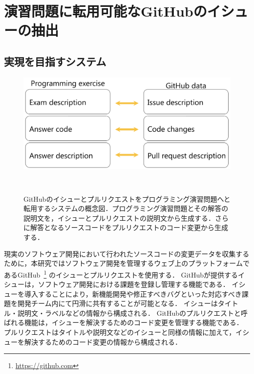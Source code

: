 \def\vector#1{\mbox{\boldmath $#1$}}

\chapter[演習問題に転用可能なGitHubのイシューの抽出]{演習問題に転用可能なGitHubのイシューの抽出}
\graphicspath{{Chapters_implementation/Figs/}}

\label{section:issue-classification}



\section{実現を目指すシステム}

\begin{figure}[tb]
    \centering
    \includegraphics[width=0.9\columnwidth]{system_diagram.png}
    \caption{GitHubのイシューとプルリクエストをプログラミング演習問題へと転用するシステムの概念図．プログラミング演習問題とその解答の説明文を，イシューとプルリクエストの説明文から生成する．さらに解答となるソースコードをプルリクエストのコード変更から生成する．}~\label{fig:system_diagram}
\end{figure}

現実のソフトウェア開発において行われたソースコードの変更データを収集するために，本研究ではソフトウェア開発を管理するウェブ上のプラットフォームであるGitHub~\footnote{\url{https://github.com}} のイシューとプルリクエストを使用する．
GitHubが提供するイシューは，ソフトウェア開発における課題を登録し管理する機能である．
イシューを導入することにより，新機能開発や修正すべきバグといった対応すべき課題を開発チーム内にて円滑に共有することが可能となる．
イシューはタイトル・説明文・ラベルなどの情報から構成される．
GitHubのプルリクエストと呼ばれる機能は，イシューを解決するためのコード変更を管理する機能である．
プルリクエストはタイトルや説明文などのイシューと同様の情報に加えて，イシューを解決するためのコード変更の情報から構成される．

